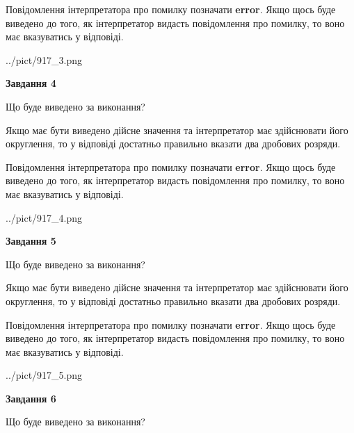 \documentclass[12pt, ukrainian]{article}
\begin{document}
{\begin {Large}
Повідомлення інтерпретатора про помилку позначати \textbf{error}.
Якщо щось буде виведено до того, як інтерпретатор видасть повідомлення про помилку, 
то воно має вказуватись у відповіді. \par

\begin{center}
	{../pict/917_3.png}
\end{center}
\newpage

{\begin {center}\textbf{Завдання 4}\end {center}}\par
Що буде виведено за виконання? \par

Якщо має бути виведено дійсне значення та інтерпретатор має здійснювати його округлення, 
то у відповіді достатньо правильно вказати два дробових розряди.

Повідомлення інтерпретатора про помилку позначати \textbf{error}.
Якщо щось буде виведено до того, як інтерпретатор видасть повідомлення про помилку, 
то воно має вказуватись у відповіді. \par

\begin{center}
	{../pict/917_4.png}
\end{center}
\newpage

{\begin {center}\textbf{Завдання 5}\end {center}}\par
Що буде виведено за виконання? \par

Якщо має бути виведено дійсне значення та інтерпретатор має здійснювати його округлення, 
то у відповіді достатньо правильно вказати два дробових розряди.

Повідомлення інтерпретатора про помилку позначати \textbf{error}.
Якщо щось буде виведено до того, як інтерпретатор видасть повідомлення про помилку, 
то воно має вказуватись у відповіді. \par

\begin{center}
	{../pict/917_5.png}
\end{center}
\newpage

{\begin {center}\textbf{Завдання 6}\end {center}}\par
Що буде виведено за виконання? \par


\end{Large}}
\end{document}
